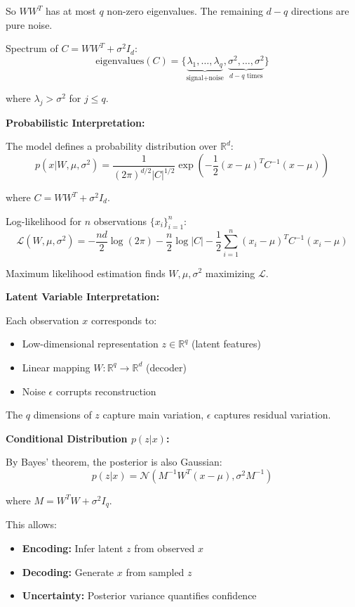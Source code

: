 \documentclass[12pt]{article}
\begin{document}
\begin{explanation}
So $WW^T$ has at most $q$ non-zero eigenvalues. The remaining $d-q$ directions are pure noise.

Spectrum of $C = WW^T + \sigma^2 I_d$:
\[
\text{eigenvalues}(C) = \{\underbrace{\lambda_1, \ldots, \lambda_q}_{\text{signal} + \text{noise}}, \underbrace{\sigma^2, \ldots, \sigma^2}_{d-q \text{ times}}\}
\]

where $\lambda_j > \sigma^2$ for $j \leq q$.

\textbf{Probabilistic Interpretation:}

The model defines a probability distribution over $\mathbb{R}^d$:
\[
p(x | W, \mu, \sigma^2) = \frac{1}{(2\pi)^{d/2}|C|^{1/2}} \exp\left(-\frac{1}{2}(x-\mu)^T C^{-1} (x-\mu)\right)
\]

where $C = WW^T + \sigma^2 I_d$.

Log-likelihood for $n$ observations $\{x_i\}_{i=1}^n$:
\[
\mathcal{L}(W, \mu, \sigma^2) = -\frac{nd}{2}\log(2\pi) - \frac{n}{2}\log|C| - \frac{1}{2}\sum_{i=1}^n (x_i - \mu)^T C^{-1}(x_i - \mu)
\]

Maximum likelihood estimation finds $W, \mu, \sigma^2$ maximizing $\mathcal{L}$.

\textbf{Latent Variable Interpretation:}

Each observation $x$ corresponds to:
\begin{itemize}
    \item Low-dimensional representation $z \in \mathbb{R}^q$ (latent features)
    \item Linear mapping $W: \mathbb{R}^q \to \mathbb{R}^d$ (decoder)
    \item Noise $\epsilon$ corrupts reconstruction
\end{itemize}

The $q$ dimensions of $z$ capture main variation, $\epsilon$ captures residual variation.

\textbf{Conditional Distribution $p(z|x)$:}

By Bayes' theorem, the posterior is also Gaussian:
\[
p(z | x) = \mathcal{N}(M^{-1}W^T(x - \mu), \sigma^2 M^{-1})
\]

where $M = W^T W + \sigma^2 I_q$.

This allows:
\begin{itemize}
    \item \textbf{Encoding:} Infer latent $z$ from observed $x$
    \item \textbf{Decoding:} Generate $x$ from sampled $z$
    \item \textbf{Uncertainty:} Posterior variance quantifies confidence
\end{itemize}


\end{explanation}
\end{document}
